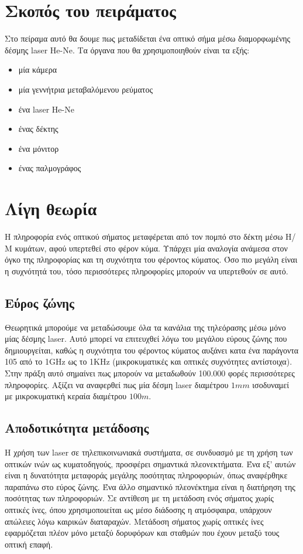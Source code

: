 \documentclass[a4paper,11pt,titlepage]{article}
\begin{document}
\section{Σκοπός του πειράματος}
Στο πείραμα αυτό θα δουμε πως μεταδίδεται ένα οπτικό σήμα μέσω διαμορφωμένης δέσμης laser He-Ne. Τα όργανα που θα χρησιμοποιηθούν είναι τα εξής: 
\begin{itemize}
	\item μία κάμερα
	\item μία γεννήτρια μεταβαλόμενου ρεύματος
	\item ένα laser He-Ne
	\item ένας δέκτης
	\item ένα μόνιτορ
	\item ένας παλμογράφος
\end{itemize}

\section{Λίγη θεωρία}
Η πληροφορία ενός οπτικού σήματος μεταφέρεται από τον πομπό στο δέκτη μέσω Η/Μ κυμάτων, αφού υπερτεθεί στο φέρον κύμα. Υπάρχει μία αναλογία ανάμεσα στον όγκο της πληροφορίας και τη συχνότητα του φέροντος κύματος. Όσο πιο μεγάλη είναι η συχνότητά του, τόσο περισσότερες πληροφορίες μπορούν να υπερτεθούν σε αυτό.
\subsection{Εύρος ζώνης}
Θεωρητικά μπορούμε να μεταδώσουμε όλα τα κανάλια της τηλεόρασης μέσω μόνο μίας δέσμης laser. Αυτό μπορεί να επιτευχθεί λόγω του μεγάλου εύρους ζώνης που δημιουργείται, καθώς η συχνότητα του φέροντος κύματος αυξάνει κατα ένα παράγοντα 105 από το 1GHz ως το 1KHz (μικροκυματικές και οπτικές συχνότητες αντίστοιχα). Στην πράξη αυτό σημαίνει πως μπορούν να μεταδωθούν 100.000 φορές περισσότερες πληροφορίες. Αξίζει να αναφερθεί πως μία δέσμη laser διαμέτρου $1mm$ ισοδυναμεί με μικροκυματική κεραία διαμέτρου $100m$.
\subsection{Αποδοτικότητα μετάδοσης}
Η χρήση των laser σε τηλεπικοινωνιακά συστήματα, σε συνδυασμό με τη χρήση των οπτικών ινών ως κυματοδηγούς, προσφέρει σημαντικά πλεονεκτήματα. Ένα εξ' αυτών είναι η δυνατότητα μεταφοράς μεγάλης ποσότητας πληροφοριών, όπως αναφέρθηκε παραπάνω στο εύρος ζώνης. Ένα άλλο σημαντικό πλεονέκτημα είναι η διατήρηση της ποσότητας των πληροφοριών. Σε αντίθεση με τη μετάδοση ενός σήματος χωρίς οπτικές ίνες, όπου χρησιμοποιείται ως μέσο διάδοσης η ατμόσφαιρα, υπάρχουν απώλειες λόγω καιρικών διαταραχών. Μετάδοση σήματος χωρίς οπτικές ίνες εφαρμόζεται πλέον μόνο μεταξύ δορυφόρων και σταθμών που έχουν μεταξύ τους οπτική επαφή.
\newpage
\end{document}
